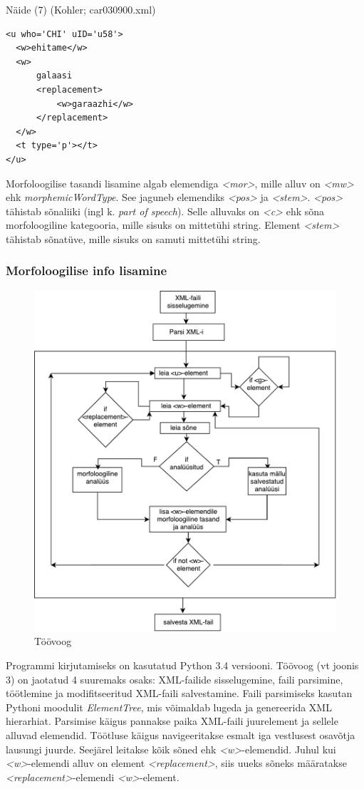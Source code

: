 \documentclass[12pt]{article}
\begin{document}
\hfill

Näide (7) (Kohler; car030900.xml)
\begin{lstlisting}
<u who='CHI' uID='u58'>
  <w>ehitame</w>
  <w>
      galaasi
      <replacement>
          <w>garaazhi</w>
      </replacement>
  </w>
  <t type='p'></t>
</u>
\end{lstlisting}

Morfoloogilise tasandi lisamine algab elemendiga \emph{<mor>}, mille alluv on \emph{<mw>} ehk \emph{morphemicWordType}. See jaguneb elemendiks \emph{<pos>} ja \emph{<stem>}. \emph{<pos>} tähistab sõnaliiki (ingl k. \emph{part of speech}). Selle alluvaks on \emph{<c>} ehk sõna morfoloogiline kategooria, mille sisuks on mittetühi string. Element \emph{<stem>} tähistab sõnatüve, mille sisuks on samuti mittetühi string.

\subsubsection{Morfoloogilise info lisamine}

\begin{figure}[H]
    \centering
    \includegraphics[width=12cm]{toovoog}
    \caption{Töövoog}
\end{figure}


Programmi kirjutamiseks on kasutatud Python 3.4 versiooni. Töövoog (vt joonis 3) on jaotatud 4 suuremaks osaks: XML-failide sisselugemine, faili parsimine, töötlemine ja modifitseeritud XML-faili salvestamine. Faili parsimiseks kasutan Pythoni moodulit \emph{ElementTree}, mis võimaldab lugeda ja genereerida XML hierarhiat. Parsimise käigus pannakse paika XML-faili juurelement ja sellele alluvad elemendid. Töötluse käigus navigeeritakse esmalt iga vestlusest osavõtja lausungi juurde. Seejärel leitakse kõik sõned ehk \emph{<w>}-elemendid. Juhul kui \emph{<w>}-elemendi alluv on element \emph{<replacement>}, siis uueks sõneks määratakse \emph{<replacement>}-elemendi \emph{<w>}-element.
\end{document}
